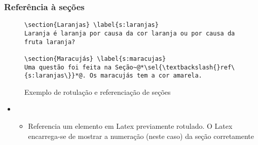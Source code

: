 \begin{frame}[fragile] \frametitle{Referência à seções}
\begin{figure}[!t]
\caption{Exemplo de rotulação e referenciação de seções}
\begin{lstlisting}
\section{Laranjas} \label{s:laranjas}
Laranja é laranja por causa da cor laranja ou por causa da fruta laranja?

\section{Maracujás} \label{s:maracujas}
Uma questão foi feita na Seção~@*\sel{\textbackslash{}ref\{s:laranjas\}}*@. Os maracujás tem a cor amarela.

\end{lstlisting}
\ownsrc
\end{figure}

\begin{itemize}
	\item {}
	\begin{itemize}
		\item Referencia um elemento em Latex previamente rotulado. O Latex encarrega-se de mostrar a numeração (neste caso) da seção corretamente
	\end{itemize}
\end{itemize}
\end{frame}
